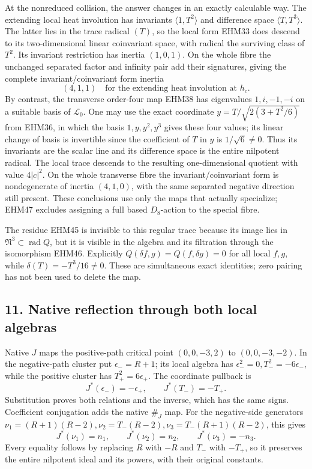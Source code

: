 \documentclass[
  10pt,
  a4paper,
]{article}
\begin{document}
At the nonreduced collision, the answer changes in an exactly calculable
way. The extending local heat involution has invariants
\(\langle1,T^2\rangle\) and difference space \(\langle T,T^3\rangle\).
The latter lies in the trace radical \((T)\), so the local form EHM33
does descend to its two-dimensional linear coinvariant space, with
radical the surviving class of \(T^2\). Its invariant restriction has
inertia \((1,0,1)\). On the whole fibre the unchanged separated factor
and infinity pair add their signatures, giving the complete
invariant/coinvariant form inertia \[
(4,1,1)\quad\text{for the extending heat involution at }h_c.
\tag{EHM50}
\] By contrast, the transverse order-four map EHM38 has eigenvalues
\(1,i,-1,-i\) on a suitable basis of \(\mathscr L_0\). One may use the
exact coordinate \(y=T/\sqrt{2(3+T^2/6)}\) from EHM36, in which the
basis \(1,y,y^2,y^3\) gives these four values; its linear change of
basis is invertible since the coefficient of \(T\) in \(y\) is
\(1/\sqrt6\ne0\). Thus its invariants are the scalar line and its
difference space is the entire nilpotent radical. The local trace
descends to the resulting one-dimensional quotient with value
\(4|c|^2\). On the whole transverse fibre the invariant/coinvariant form
is nondegenerate of inertia \((4,1,0)\), with the same separated
negative direction still present. These conclusions use only the maps
that actually specialize; EHM47 excludes assigning a full based
\(D_8\)-action to the special fibre.

The residue EHM45 is invisible to this regular trace because its image
lies in \(\mathfrak N^3\subset\operatorname{rad}Q\), but it is visible
in the algebra and its filtration through the isomorphism EHM46.
Explicitly \(Q(\delta f,g)=Q(f,\delta g)=0\) for all local \(f,g\),
while \(\delta(T)=-T^3/16\ne0\). These are simultaneous exact
identities; zero pairing has not been used to delete the map.

\subsection{11. Native reflection through both local
algebras}\label{native-reflection-through-both-local-algebras}

Native \(J\) maps the positive-path critical point \((0,0,-3,2)\) to
\((0,0,-3,-2)\). In the negative-path cluster put \(\epsilon_-=R+1\);
its local algebra has \(\epsilon_-^2=0,T_-^2=-6\epsilon_-\), while the
positive cluster has \(T_+^2=6\epsilon_+\). The coordinate pullback is
\[
J^*(\epsilon_-)=-\epsilon_+,\qquad J^*(T_-)=-T_+.
\tag{EHM51}
\] Substitution proves both relations and the inverse, which has the
same signs. Coefficient conjugation adds the native \(\#_J\) map. For
the negative-side generators
\(\nu_1=(R+1)(R-2),\nu_2=T_-(R-2),\nu_3=T_-(R+1)(R-2)\), this gives \[
J^*(\nu_1)=n_1,\qquad J^*(\nu_2)=n_2,\qquad J^*(\nu_3)=-n_3.
\tag{EHM52}
\] Every equality follows by replacing \(R\) with \(-R\) and \(T_-\)
with \(-T_+\), so it preserves the entire nilpotent ideal and its
powers, with their original constants.
\end{document}
